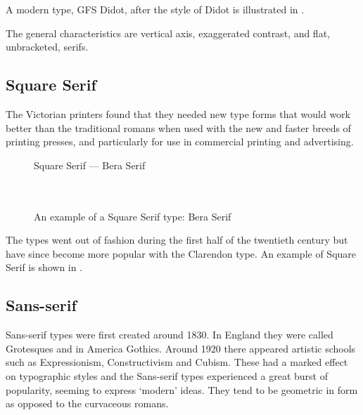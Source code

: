 \documentclass[10pt,letterpaper,extrafontsizes]{memoir}
\begin{document}
A modern type, GFS Didot,
after the style of 
Didot is illustrated in .

    The general characteristics are vertical axis, exaggerated contrast, 
and flat, unbracketed, serifs.
    
\subsection{Square Serif}

    The Victorian printers found that they needed new type forms that
would work better than the traditional romans when used with the new 
and faster breeds of printing presses, and particularly for use in
commercial printing and advertising. 

\begin{figure}
\centering
{\centering{}\selectfont
  Square Serif --- Bera Serif \\
  \UCalphabet \\
  \LCalphabet \\
  \fox\par}
\caption{An example of a Square Serif type: Bera Serif} 
   \label{fig:beraserif}
\end{figure}

    The types went out of fashion during the first half of the twentieth
century but have since become more popular with the 
Clarendon
type. An example of Square Serif
is shown in .


\subsection{Sans-serif}

    Sans-serif types were first created around 1830. In England they were
called Grotesques and in America Gothics. 
Around 1920 there appeared artistic
schools such as Expressionism, Constructivism and Cubism. These had a
marked effect on typographic styles and the Sans-serif types experienced
a great burst of popularity, seeming to express `modern' ideas. They tend to
be geometric in form as opposed to the curvaceous romans.
\end{document}

